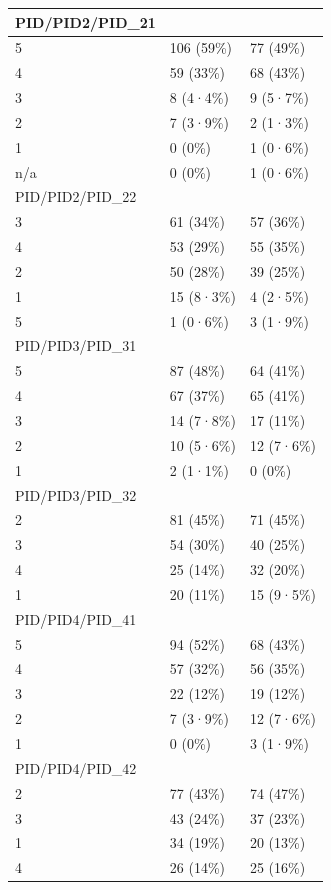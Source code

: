 \documentclass[
]{book}
\begin{document}
\begin{tabular}{l|l|l}
\hline
PID/PID2/PID\_21 &  & \\
\hline
5 & 106 (59\%) & 77 (49\%)\\
\hline
4 & 59 (33\%) & 68 (43\%)\\
\hline
3 & 8 (4·4\%) & 9 (5·7\%)\\
\hline
2 & 7 (3·9\%) & 2 (1·3\%)\\
\hline
1 & 0 (0\%) & 1 (0·6\%)\\
\hline
n/a & 0 (0\%) & 1 (0·6\%)\\
\hline
PID/PID2/PID\_22 &  & \\
\hline
3 & 61 (34\%) & 57 (36\%)\\
\hline
4 & 53 (29\%) & 55 (35\%)\\
\hline
2 & 50 (28\%) & 39 (25\%)\\
\hline
1 & 15 (8·3\%) & 4 (2·5\%)\\
\hline
5 & 1 (0·6\%) & 3 (1·9\%)\\
\hline
PID/PID3/PID\_31 &  & \\
\hline
5 & 87 (48\%) & 64 (41\%)\\
\hline
4 & 67 (37\%) & 65 (41\%)\\
\hline
3 & 14 (7·8\%) & 17 (11\%)\\
\hline
2 & 10 (5·6\%) & 12 (7·6\%)\\
\hline
1 & 2 (1·1\%) & 0 (0\%)\\
\hline
PID/PID3/PID\_32 &  & \\
\hline
2 & 81 (45\%) & 71 (45\%)\\
\hline
3 & 54 (30\%) & 40 (25\%)\\
\hline
4 & 25 (14\%) & 32 (20\%)\\
\hline
1 & 20 (11\%) & 15 (9·5\%)\\
\hline
PID/PID4/PID\_41 &  & \\
\hline
5 & 94 (52\%) & 68 (43\%)\\
\hline
4 & 57 (32\%) & 56 (35\%)\\
\hline
3 & 22 (12\%) & 19 (12\%)\\
\hline
2 & 7 (3·9\%) & 12 (7·6\%)\\
\hline
1 & 0 (0\%) & 3 (1·9\%)\\
\hline
PID/PID4/PID\_42 &  & \\
\hline
2 & 77 (43\%) & 74 (47\%)\\
\hline
3 & 43 (24\%) & 37 (23\%)\\
\hline
1 & 34 (19\%) & 20 (13\%)\\
\hline
4 & 26 (14\%) & 25 (16\%)\\

\end{tabular}
\end{document}
